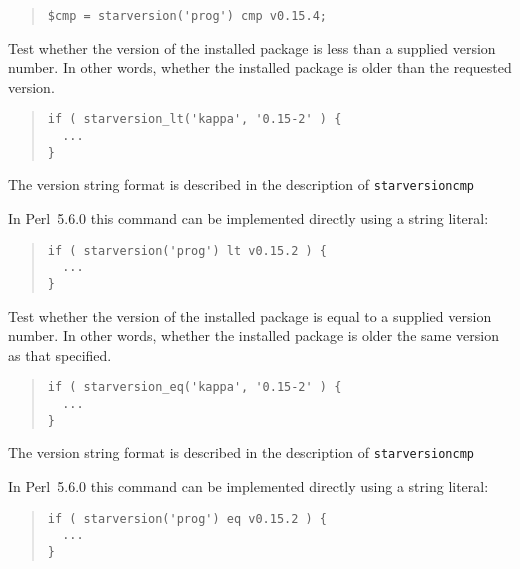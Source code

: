 \documentclass[twoside,11pt]{article}
\newenvironment{myquote}{\begin{quote}\begin{small}}{\end{small}\end{quote}}
\newcommand{\perl}{\xref{\textsf{Perl}}{sun193}{}}
\newcommand{\xref}[3]{#1}
\renewcommand{\_}{\texttt{\symbol{95}}}
\begin{document}
\begin{description}
\begin{myquote}
\begin{verbatim}
$cmp = starversion('prog') cmp v0.15.4;
\end{verbatim} 
\end{myquote} %

\item[starversion\_lt] \mbox{}
  
  Test whether the version of the installed package is less than a supplied
  version number. In other words, whether the installed package is older than
  the requested version.

\begin{myquote}
\begin{verbatim}
if ( starversion_lt('kappa', '0.15-2' ) {
  ...
}
\end{verbatim}
\end{myquote}

The version string format is described in the description of
\texttt{starversion\_cmp}



In \perl\ 5.6.0 this command can be implemented directly using a string literal:

\begin{myquote}
\begin{verbatim}
if ( starversion('prog') lt v0.15.2 ) {
  ...
}
\end{verbatim}
\end{myquote}

\item[starversion\_eq] \mbox{}

Test whether the version of the installed package is equal to a supplied
version number. In other words, whether the installed package is older the
same version as that specified.

\begin{myquote}
\begin{verbatim}
if ( starversion_eq('kappa', '0.15-2' ) {
  ...
}
\end{verbatim}
\end{myquote}

The version string format is described in the description of
\texttt{starversion\_cmp}



In \perl\ 5.6.0 this command can be implemented directly using a string literal:

\begin{myquote}
\begin{verbatim}
if ( starversion('prog') eq v0.15.2 ) {
  ...
}
\end{verbatim}
\end{myquote}


\end{description}
\end{document}

